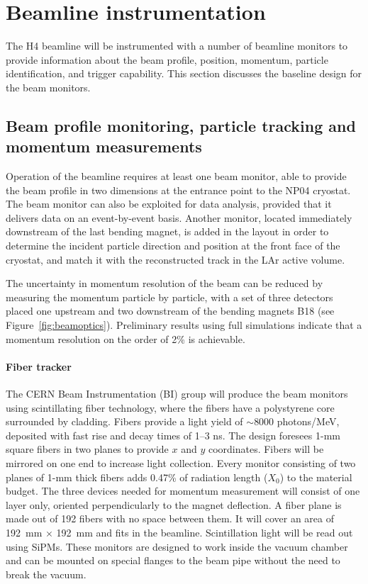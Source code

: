 \section{Beamline instrumentation}
\label{sec:beaminstruments}

The H4 beamline will be instrumented with a number of beamline monitors to provide information 
 about the beam profile, position, momentum, particle identification, and trigger capability. 
This section discusses the baseline design for the beam monitors. 

\subsection{Beam profile monitoring, particle tracking and momentum measurements}

Operation of the beamline requires at least one beam  monitor, able to provide the beam profile in two dimensions at the entrance point to the NP04 cryostat.   The beam monitor can also be exploited for data analysis, provided that it delivers data on an event-by-event basis. Another monitor, located immediately downstream of the last bending magnet, is added in the layout  in order to determine the incident particle  direction and position at the front face of the cryostat, and match it with the reconstructed track in the LAr active volume.

The uncertainty in momentum resolution of the beam can be reduced by measuring the momentum particle by particle, with a set of three detectors placed one upstream and two downstream of the bending magnets B18 (see Figure~\ref{fig:beamoptics}).  
Preliminary results using full simulations indicate that a momentum resolution on the order of  2\% is achievable. 
%
\paragraph{Fiber tracker}
The CERN Beam Instrumentation (BI) group will produce
 the beam monitors %
 using scintillating fiber technology, where %
 the fibers have a polystyrene core surrounded by cladding. Fibers provide a light yield of $\sim$8000 photons/MeV, deposited with fast rise and decay times of 1--3 ns. The design foresees 1-mm square fibers in two planes to provide $x$ and $y$ coordinates. Fibers will be mirrored on one end to increase
light collection.  Every monitor consisting of two planes of 1-mm thick fibers adds 0.47\% of radiation length ($X_0$) to the material budget. 
The three devices needed for momentum measurement will consist of one layer only, oriented perpendicularly to the magnet deflection.
A fiber plane is made out of 192 fibers with no space between them. It will cover an area of 192~mm $\times$ 192~mm and fits in the beamline.
Scintillation light will be read out using SiPMs.
%
These monitors are designed to work inside the vacuum chamber and can be mounted on special flanges to the beam pipe without the need to break the vacuum.

